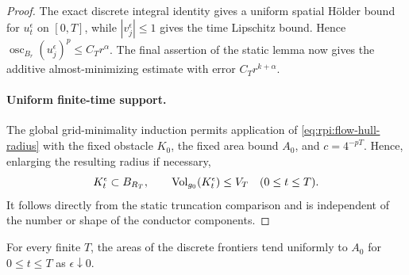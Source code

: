 \begin{proof}
The exact discrete integral identity gives a uniform spatial
H\"older bound for $u_t^\epsilon$ on $[0,T]$, while $|v_j^\epsilon|\le1$
gives the time Lipschitz bound. Hence
$\operatorname{osc}_{B_r}(u_j^\epsilon)^p\le C_T r^\alpha$.
The final assertion of the static lemma now gives the additive
almost-minimizing estimate with error $C_T r^{k+\alpha}$.

\paragraph{Uniform finite-time support.}
The global grid-minimality induction permits application of
\eqref{eq:rpi:flow-hull-radius} with the fixed obstacle $K_0$,
the fixed area bound $A_0$, and $c=4^{-pT}$. Hence, enlarging
the resulting radius if necessary,
\begin{equation}
\label{eq:rpi:flow-support}
 K_t^\epsilon\subset B_{R_T},\qquad
 \operatorname{Vol}_{g_0}(K_t^\epsilon)\le V_T
 \quad(0\le t\le T).
\end{equation}
It follows directly from the static truncation comparison and is
independent of the number or shape of the conductor components.

\end{proof}

\begin{proposition}
\label{prop:rpi:discrete-area}
For every finite $T$, the areas of the discrete frontiers tend uniformly
to $A_0$ for $0\le t\le T$ as $\epsilon\downarrow0$.
\end{proposition}

